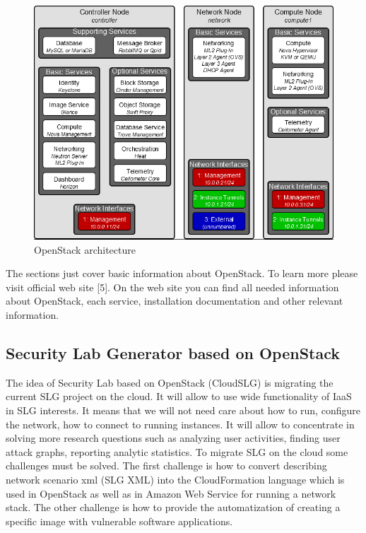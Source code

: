 \begin{figure}[ht!]
\centering
\includegraphics[width=\textwidth]{openstack_architecture.png}
\caption{OpenStack architecture}
\label{overflow}
\end{figure}

The sections just cover basic information about OpenStack. To learn more please visit official web site [5]. On the web site you can find all needed information about OpenStack, each service, installation documentation and other relevant information. 


\subsection{Security Lab Generator based on OpenStack}
The idea of Security Lab based on OpenStack (CloudSLG) is migrating the current SLG project on the cloud. It will allow to use wide functionality of IaaS in SLG interests. It means that we will not need care about how to run, configure the network, how to connect to running instances. It will allow to concentrate in solving more research questions such as analyzing user activities, finding user attack graphs, reporting analytic statistics. To migrate SLG on the cloud some challenges must be solved. The first challenge is how to convert describing network scenario xml (SLG XML) into the CloudFormation language which is used in OpenStack as well as in Amazon Web Service for running a network stack. The other challenge is how to provide the automatization of creating a specific image with vulnerable software applications.   



% 